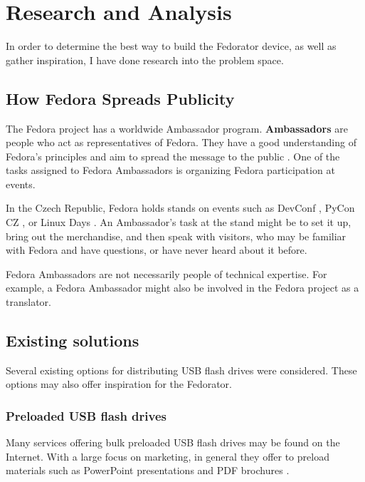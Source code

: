 \chapter{Research and Analysis}
    In order to determine the best way to build the Fedorator device, as well as gather inspiration, I have done research into the problem space.
    
    \section{How Fedora Spreads Publicity}
        The Fedora project has a worldwide Ambassador program.  \textbf{Ambassadors} are people who act as representatives of Fedora.  They have a good understanding of Fedora's principles and aim to spread the message to the public \cite{fedora-ambassadors}.  One of the tasks assigned to Fedora Ambassadors is organizing Fedora participation at events.
        
        In the Czech Republic, Fedora holds stands on events such as DevConf \cite{devconf}, PyCon CZ \cite{pycon-cz}, or Linux Days \cite{linux-days}.  An Ambassador's task at the stand might be to set it up, bring out the merchandise, and then speak with visitors, who may be familiar with Fedora and have questions, or have never heard about it before.
        
        Fedora Ambassadors are not necessarily people of technical expertise.  For example, a Fedora Ambassador might also be involved in the Fedora project as a translator.
        
    \section{Existing solutions}
        Several existing options for distributing USB flash drives were considered.  These options may also offer inspiration for the Fedorator.
        
        \subsection{Preloaded USB flash drives}
            Many services offering bulk preloaded USB flash drives may be found on the Internet.  With a large focus on marketing, in general they offer to preload materials such as PowerPoint presentations and PDF brochures \cite{flashbay-data-preloading}.
            
